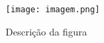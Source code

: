 
\begin{figure}[htbp]
    \centering
    \texttt{[image: imagem.png]}
    \caption{Descrição da figura}
    \label{fig:exemplo}
\end{figure}







